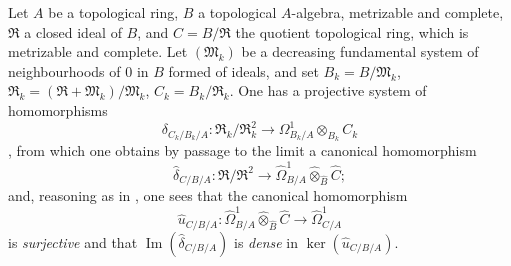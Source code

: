 \begin{env}[20.7.20]
\label{0.20.7.20}
Let $A$ be a topological ring, $B$ a topological $A$-algebra, metrizable and complete, $\mathfrak{R}$ a closed ideal of $B$, and $C=B/\mathfrak{R}$ the quotient topological ring, which is metrizable and complete. Let $(\mathfrak{M}_k)$ be a decreasing fundamental system of neighbourhoods of $0$ in $B$ formed of ideals, and set $B_k=B/\mathfrak{M}_k$, $\mathfrak{R}_k=(\mathfrak{R}+\mathfrak{M}_k)/\mathfrak{M}_k$, $C_k=B_k/\mathfrak{R}_k$. One has a projective system of homomorphisms
\[
  \delta_{C_k/B_k/A}:\mathfrak{R}_k/\mathfrak{R}_k^2\longrightarrow\Omega^1_{B_k/A}\otimes_{B_k}C_k
\]
, from which one obtains by passage to the limit a canonical homomorphism
\[
  \widehat{\delta}_{C/B/A}:\mathfrak{R}/\mathfrak{R}^2\longrightarrow
  \widehat{\Omega}^1_{B/A}\widehat{\otimes}_{\widehat{B}}\widehat{C};
\]
and, reasoning as in , one sees that the canonical homomorphism
\[
  \widehat{u}_{C/B/A}:\widehat{\Omega}^1_{B/A}\widehat{\otimes}_{\widehat{B}}\widehat{C}\longrightarrow\widehat{\Omega}^1_{C/A}
\]
is \emph{surjective} and that $\operatorname{Im}(\widehat{\delta}_{C/B/A})$ is \emph{dense} in $\ker(\widehat{u}_{C/B/A})$.
\end{env}
